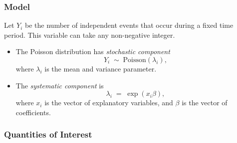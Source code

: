 \subsubsection{Model}
Let $Y_i$ be the number of independent events that occur during a
fixed time period. This variable can take any non-negative integer.

\begin{itemize}
\item The Poisson distribution has \emph{stochastic component}
  \begin{equation*}
    Y_i \; \sim \; \textrm{Poisson}(\lambda_i),
  \end{equation*}
  where $\lambda_i$ is the mean and variance parameter.
  
\item The \emph{systematic component} is 
  \begin{equation*}
    \lambda_i \; = \; \exp(x_i \beta),
  \end{equation*}
  where $x_i$ is the vector of explanatory variables, and $\beta$ is
  the vector of coefficients.
\end{itemize}

\subsubsection{Quantities of Interest}

